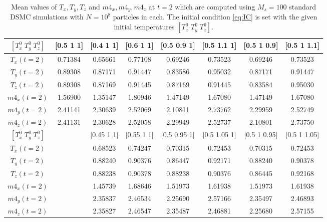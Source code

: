 \documentclass[times,final,nopreprintline]{elsarticle}
\begin{document}
\begin{table} %
\small %
\setlength{\tabcolsep}{2pt}
\centering 
\begin{tabular}{|c|c|c|c|c|c|c|c|} 
  \hline
$[T_x^0 \; T_y^0 \; T_z^0]$ & [0.5 1 1] & [0.4 1 1] & [0.6 1 1] & [0.5 0.9 1] & [0.5 1.1 1] & [0.5 1 0.9] & [0.5 1 1.1] \\
  \hline
$T_x(t=2)$  &  0.71384 &  0.65661 &  0.77108 &  0.69246 &  0.73523 &  0.69246 &  0.73523 \\
$T_y(t=2)$  &  0.89308 &  0.87171 &  0.91447 &  0.83586 &  0.95032 &  0.87171 &  0.91447 \\
$T_z(t=2)$  &  0.89308 &  0.87169 &  0.91445 &  0.87169 &  0.91445 &  0.83584 &  0.95030 \\
$m4_x(t=2)$ &  1.56900 &  1.35147 &  1.80946 &  1.47149 &  1.67080 &  1.47149 &  1.67080 \\
$m4_y(t=2)$ &  2.41141 &  2.30639 &  2.52069 &  2.10811 &  2.73762 &  2.29959 &  2.52749 \\
$m4_z(t=2)$ &  2.41131 &  2.30628 &  2.52058 &  2.29949 &  2.52737 &  2.10801 &  2.73750 \\
  \hline
$[T_x^0 \; T_y^0 \; T_z^0]$ &   & [0.45 1 1] & [0.55 1 1] & [0.5 0.95 1] & [0.5 1.05 1] & [0.5 1 0.95] & [0.5 1 1.05] \\
  \hline
$T_x(t=2)$  &   & 0.68523 & 0.74247 & 0.70315 & 0.72453 & 0.70315 & 0.72453 \\
$T_y(t=2)$  &   & 0.88240 & 0.90376 & 0.86447 & 0.92171 & 0.88240 & 0.90378 \\
$T_z(t=2)$  &   & 0.88238 & 0.90378 & 0.88238 & 0.90376 & 0.86445 & 0.92168 \\
$m4_x(t=2)$ &   & 1.45739 & 1.68646 & 1.51973 & 1.61938 & 1.51973 & 1.61938 \\
$m4_y(t=2)$ &   & 2.35837 & 2.46534 & 2.25690 & 2.57166 & 2.35497 & 2.46893 \\
$m4_z(t=2)$ &   & 2.35827 & 2.46547 & 2.35487 & 2.46881 & 2.25680 & 2.57155 \\
   \hline
\end{tabular} 
  \caption{Mean values of $T_x, T_y, T_z$ and $m4_x, m4_y, m4_z$ at $t=2$ which are computed using $M_s=100$ standard DSMC simulations with $N=10^8$ particles in each. The initial condition \eqref{eq:IC} is set with the given initial temperatures $[T_x^0 \; T_y^0 \; T_z^0]$.}\label{Table2}
\end{table}
\end{document}
